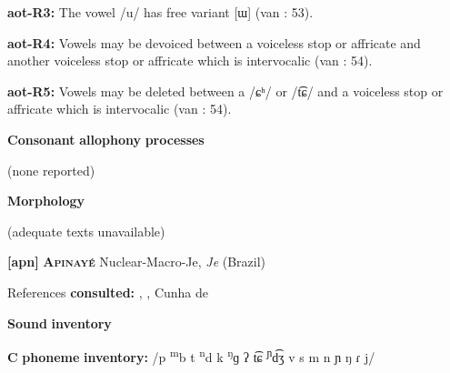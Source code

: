 \documentclass[output=paper]{langsci/langscibook}
\begin{document}
\begin{styleBody}
\textbf{aot-R3:} The vowel /u/ has free variant [ɯ] (van \citealt{Breugel2008}: 53).
\end{styleBody}

\begin{styleBody}
\textbf{aot-R4:} Vowels may be devoiced between a voiceless stop or affricate and another voiceless stop or affricate which is intervocalic (van \citealt{Breugel2008}: 54).
\end{styleBody}

\begin{styleBody}
\textbf{aot-R5:} Vowels may be deleted between a /ɕʰ/ or /t͡ɕ/ and a voiceless stop or affricate which is intervocalic (van \citealt{Breugel2008}: 54).
\end{styleBody}

\begin{styleBody}
\textbf{Consonant} \textbf{allophony} \textbf{processes}
\end{styleBody}

\begin{styleBody}
(none reported)
\end{styleBody}

\begin{styleBody}
\textbf{Morphology}
\end{styleBody}

\begin{styleBody}
(adequate texts unavailable)
\end{styleBody}

\begin{styleBody}
\textbf{[apn]}   \textbf{\textsc{Apinayé}}  Nuclear-Macro-Je, \textit{Je} (Brazil)
\end{styleBody}

\begin{styleBody}
References \textbf{consulted:} \citet{BurgessHam1968}, \citet{Ham2009}, Cunha de \citet{Oliveira2005}
\end{styleBody}

\begin{styleBody}
\textbf{Sound} \textbf{inventory}
\end{styleBody}

\begin{styleBody}
\textbf{C} \textbf{phoneme} \textbf{inventory:} /p \textsuperscript{m}b t \textsuperscript{n}d k \textsuperscript{ŋ}ɡ ʔ t͡ɕ \textsuperscript{ɲ}d͡ʒ v s m n ɲ ŋ ɾ j/
\end{styleBody}
\end{document}
